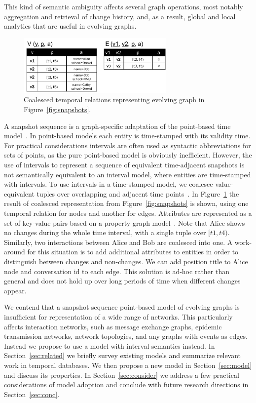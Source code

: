 This kind of semantic ambiguity affects several graph operations, most
notably aggregation and retrieval of change history, and, as a result,
global and local analytics that are useful in evolving graphs.

\begin{figure}[t]
\includegraphics[width=3in]{figs/T1_relations.pdf}
\caption{Coalesced temporal relations representing evolving graph in Figure~\ref{fig:snapshots}.}
\vspace{-0.4cm}
\label{fig:coalesced}
\end{figure}

A snapshot sequence is a graph-specific adaptation of the point-based
time model~\cite{Toman2009}.  In point-based models each entity is
time-stamped with its validity time.  For practical considerations
intervals are often used as syntactic abbreviations for sets of
points, as the pure point-based model is obviously inefficient.
However, the use of intervals to represent a sequence of equivalent
time-adjacent snapshots is not semantically equivalent to an interval
model, where entities are time-stamped with intervals.  To use
intervals in a time-stamped model, we coalesce value-equivalent tuples
over overlapping and adjacent time points~\cite{Bohlen09}.  In
Figure~\ref{fig:coalesced} the result of coalesced representation from
Figure~\ref{fig:snapshots} is shown, using one temporal relation for
nodes and another for edges.  Attributes are represented as a set of
key-value pairs based on a property graph model~\cite{Angles2008}.
Note that Alice shows no changes during the whole time interval, with
a single tuple over $[t1, t4)$.  Similarly, two interactions between
  Alice and Bob are coalesced into one.  A work-around for this
  situation is to add additional attributes to entities in order to
  distinguish between changes and non-changes.  We can add position
  title to Alice node and conversation id to each edge.  This solution
  is ad-hoc rather than general and does not hold up over long periods
  of time when different changes appear.

We contend that a snapshot sequence point-based model of evolving
graphs is insufficient for representation of a wide range of networks.
This particularly affects interaction networks, such as message
exchange graphs, epidemic transmission networks, network topologies,
and any graphs with events as edges.  Instead we propose to use a
model with interval semantics instead.  In Section~\ref{sec:related}
we briefly survey existing models and summarize relevant work in
temporal databases.  We then propose a new model in
Section~\ref{sec:model} and discuss its properties.  In
Section~\ref{sec:consider} we address a few practical considerations
of model adoption and conclude with future research directions in
Section~\ref{sec:conc}.
